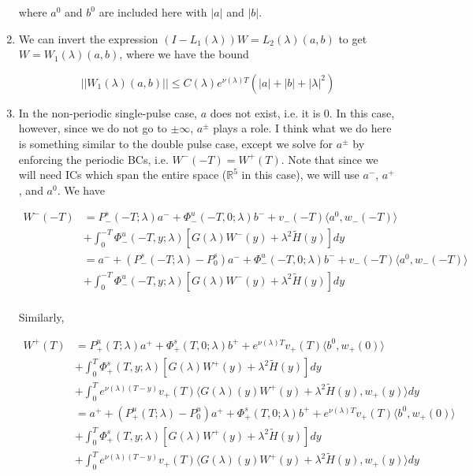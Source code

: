 \documentclass[12pt]{article}
\def\R{{\mathbb R}}
\begin{document}
\begin{enumerate}
where $a^0$ and $b^0$ are included here with $|a|$ and $|b|$.

\item We can invert the expression $(I - L_1(\lambda))W = L_2(\lambda)(a,b)$ to get $W = W_1(\lambda)(a,b)$, where we have the bound

\[
||W_1(\lambda)(a,b)|| \leq C(\lambda) e^{\nu(\lambda)T} (|a| + |b| + |\lambda|^2)
\]

\item In the non-periodic single-pulse case, $a$ does not exist, i.e. it is 0. In this case, however, since we do not go to $\pm \infty$, $a^\pm$ plays a role. I think what we do here is something similar to the double pulse case, except we solve for $a^\pm$ by enforcing the periodic BCs, i.e. $W^-(-T) = W^+(T)$. Note that since we will need ICs which span the entire space ($\R^5$ in this case), we will use $a^-$, $a^+$, and $a^0$. We have 

\begin{align*}
W^-(-T) &= P^s_-(-T; \lambda)a^- + \Phi^u_-(-T, 0; \lambda)b^- + v_-(-T) \langle a^0, w_-(-T) \rangle \\
&+ \int_0^{-T} \Phi^u_-(-T, y; \lambda)[ G(\lambda)W^-(y) + \lambda^2 \tilde{H}(y) ] dy \\
&= a^- + (P^s_-(-T; \lambda) - P_0^s)a^- + \Phi^u_-(-T, 0; \lambda)b^- + v_-(-T) \langle a^0, w_-(-T) \rangle \\
&+ \int_0^{-T} \Phi^u_-(-T, y; \lambda)[ G(\lambda)W^-(y) + \lambda^2 \tilde{H}(y) ] dy \\
\end{align*}

Similarly,

\begin{align*}
W^+(T) &= P^u_+(T; \lambda)a^+ + \Phi^s_+(T, 0; \lambda)b^+ + e^{\nu(\lambda)T} v_+(T) \langle b^0, w_+(0) \rangle \\
&+ \int_0^T \Phi^s_+(T, y; \lambda) [ G(\lambda)W^+(y) + \lambda^2 \tilde{H}(y) ] dy \\
&+ \int_0^T e^{\nu(\lambda)(T-y)} v_+(T) \langle G(\lambda)(y)W^+(y) + \lambda^2 \tilde{H}(y), w_+(y) \rangle dy \\
&= a^+ + (P^u_+(T; \lambda) - P^u_0)a^+ + \Phi^s_+(T, 0; \lambda)b^+ + e^{\nu(\lambda)T} v_+(T) \langle b^0, w_+(0) \rangle \\
&+ \int_0^T \Phi^s_+(T, y; \lambda) [ G(\lambda)W^+(y) + \lambda^2 \tilde{H}(y) ] dy \\
&+ \int_0^T e^{\nu(\lambda)(T-y)} v_+(T) \langle G(\lambda)(y)W^+(y) + \lambda^2 \tilde{H}(y), w_+(y) \rangle dy
\end{align*}


\end{enumerate}
\end{document}

